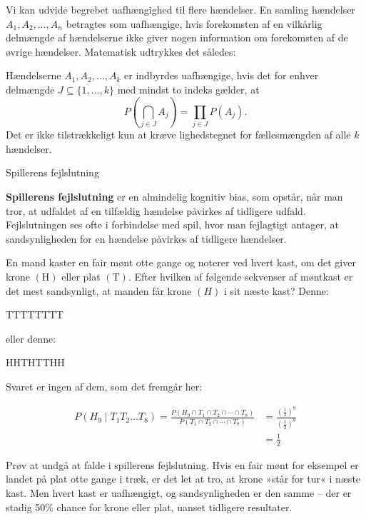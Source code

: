 Vi kan udvide begrebet uafhængighed til flere hændelser. En samling hændelser \( A_1, A_2, \ldots, A_n \) betragtes som uafhængige, hvis forekomsten af en vilkårlig delmængde af hændelserne ikke giver nogen information om forekomsten af de øvrige hændelser. Matematisk udtrykkes det således:

\begin{definition}
    Hændelserne \( A_1, A_2, \ldots, A_k \) er indbyrdes uafhængige, hvis det for enhver delmængde \(J\subseteq\{1,\ldots,k\}\) med mindst to indeks gælder, at
    \[
    P\left(\bigcap_{j\in J}A_j\right)=\prod_{j\in J}P(A_j).
    \]
    Det er ikke tilstrækkeligt kun at kræve lighedstegnet for fællesmængden af alle \(k\) hændelser.
\end{definition}

\begin{example} Spillerens fejlslutning

\textbf{Spillerens fejlslutning} er en almindelig kognitiv bias, som opstår, når man tror, at udfaldet af en tilfældig hændelse påvirkes af tidligere udfald. Fejlslutningen ses ofte i forbindelse med spil, hvor man fejlagtigt antager, at sandsynligheden for en hændelse påvirkes af tidligere hændelser.

En mand kaster en fair mønt otte gange og noterer ved hvert kast, om det giver krone $(\mathrm{H})$ eller plat $(\mathrm{T})$. Efter hvilken af følgende sekvenser af møntkast er det mest sandsynligt, at manden får krone $(H)$ i sit næste kast? Denne:

TTTTTTTT

eller denne:

HHTHTTHH

Svaret er ingen af dem, som det fremgår her:

\begin{align*}
        P\left(H_9 \mid T_1 T_2 \ldots T_8\right)=\frac{P\left(H_9 \cap T_1 \cap T_2 \cap \cdots \cap T_8\right)}{P\left(T_1 \cap T_2 \cap \cdots \cap T_8\right)} & =\frac{\left(\frac{1}{2}\right)^9}{\left(\frac{1}{2}\right)^8} \\
        & =\frac{1}{2}
\end{align*}
    
\end{example}

Prøv at undgå at falde i spillerens fejlslutning. Hvis en fair mønt for eksempel er landet på plat otte gange i træk, er det let at tro, at krone »står for tur« i næste kast. Men hvert kast er uafhængigt, og sandsynligheden er den samme -- der er stadig 50\% chance for krone eller plat, uanset tidligere resultater.


